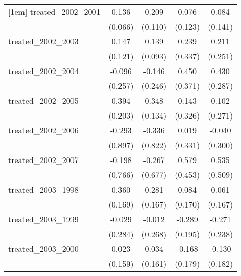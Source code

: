 {\begin{tabular}{l*{4}{c}}
[1em]
treated\_2002\_2001&       0.136\sym{*}  &       0.209         &       0.076         &       0.084         \\
            &     (0.066)         &     (0.110)         &     (0.123)         &     (0.141)         \\
[1em]
treated\_2002\_2003&       0.147         &       0.139         &       0.239         &       0.211         \\
            &     (0.121)         &     (0.093)         &     (0.337)         &     (0.251)         \\
[1em]
treated\_2002\_2004&      -0.096         &      -0.146         &       0.450         &       0.430         \\
            &     (0.257)         &     (0.246)         &     (0.371)         &     (0.287)         \\
[1em]
treated\_2002\_2005&       0.394         &       0.348\sym{**} &       0.143         &       0.102         \\
            &     (0.203)         &     (0.134)         &     (0.326)         &     (0.271)         \\
[1em]
treated\_2002\_2006&      -0.293         &      -0.336         &       0.019         &      -0.040         \\
            &     (0.897)         &     (0.822)         &     (0.331)         &     (0.300)         \\
[1em]
treated\_2002\_2007&      -0.198         &      -0.267         &       0.579         &       0.535         \\
            &     (0.766)         &     (0.677)         &     (0.453)         &     (0.509)         \\
[1em]
treated\_2003\_1998&       0.360\sym{*}  &       0.281         &       0.084         &       0.061         \\
            &     (0.169)         &     (0.167)         &     (0.170)         &     (0.167)         \\
[1em]
treated\_2003\_1999&      -0.029         &      -0.012         &      -0.289         &      -0.271         \\
            &     (0.284)         &     (0.268)         &     (0.195)         &     (0.238)         \\
[1em]
treated\_2003\_2000&       0.023         &       0.034         &      -0.168         &      -0.130         \\
            &     (0.159)         &     (0.161)         &     (0.179)         &     (0.182)         \\

\end{tabular}}

